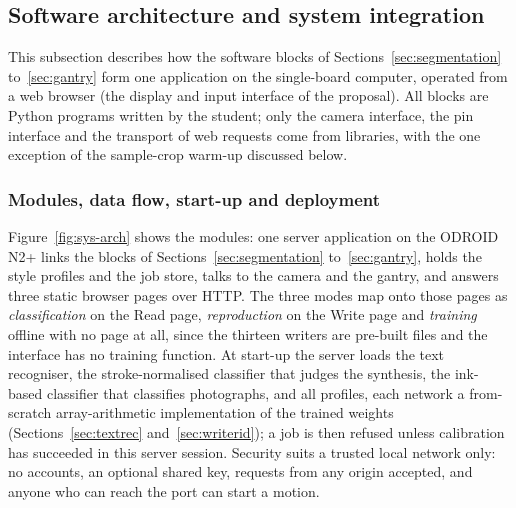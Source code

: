 \subsection{Software architecture and system integration}
\label{sec:system}

This subsection describes how the software blocks of Sections~\ref{sec:segmentation} to~\ref{sec:gantry} form one application on the single-board computer, operated from a web browser (the display and input interface of the proposal). All blocks are Python programs written by the student; only the camera interface, the pin interface and the transport of web requests come from libraries, with the one exception of the sample-crop warm-up discussed below.

\subsubsection{Modules, data flow, start-up and deployment}

Figure~\ref{fig:sys-arch} shows the modules: one server application on the ODROID N2+ links the blocks of Sections~\ref{sec:segmentation} to~\ref{sec:gantry}, holds the style profiles and the job store, talks to the camera and the gantry, and answers three static browser pages over HTTP. The three modes map onto those pages as \emph{classification} on the Read page, \emph{reproduction} on the Write page and \emph{training} offline with no page at all, since the thirteen writers are pre-built files and the interface has no training function.
At start-up the server loads the text recogniser, the stroke-normalised classifier that judges the synthesis, the ink-based classifier that classifies photographs, and all profiles, each network a from-scratch array-arithmetic implementation of the trained weights (Sections~\ref{sec:textrec} and~\ref{sec:writerid}); a job is then refused unless calibration has succeeded in this server session. Security suits a trusted local network only: no accounts, an optional shared key, requests from any origin accepted, and anyone who can reach the port can start a motion.

